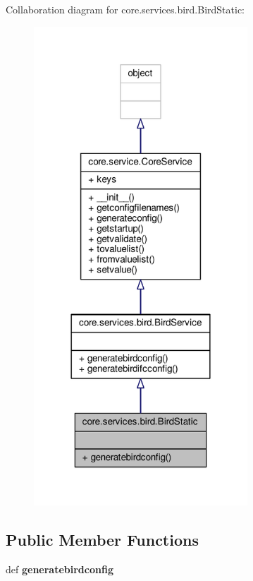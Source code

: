 Collaboration diagram for core.\+services.\+bird.\+Bird\+Static\+:
\nopagebreak
\begin{figure}[H]
\begin{center}
\leavevmode
\includegraphics[width=227pt]{classcore_1_1services_1_1bird_1_1_bird_static__coll__graph}
\end{center}
\end{figure}
\subsection*{Public Member Functions}
\begin{DoxyCompactItemize}
\item 
\hypertarget{classcore_1_1services_1_1bird_1_1_bird_static_ab7e3c1e6ce131c1052f5f206a979588a}{def {\bfseries generatebirdconfig}}\label{classcore_1_1services_1_1bird_1_1_bird_static_ab7e3c1e6ce131c1052f5f206a979588a}

\end{DoxyCompactItemize}
